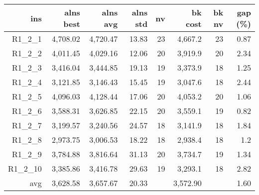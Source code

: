   \begin{table}[caption={Kết quả đo với tập HG\_R\_1\_2 200 yêu cầu}, label=exp:HGR12]
      \centering
      \begin{tabular}{rrrrrrrr}
        \hline
        ins & alns best & alns avg & alns std & nv & bk cost & bk nv & gap (\%) \\ \hline
        R1\_2\_1 & 4,708.02 & 4,720.47 & 13.83 & 23 & 4,667.2 & 23 & 0.87 \\ \hline
        R1\_2\_2 & 4,011.45 & 4,029.16 & 12.06 & 20 & 3,919.9 & 20 & 2.34 \\ \hline
        R1\_2\_3 & 3,416.04 & 3,444.85 & 19.13 & 19 & 3,373.9 & 18 & 1.25 \\ \hline
        R1\_2\_4 & 3,121.85 & 3,146.43 & 15.45 & 19 & 3,047.6 & 18 & 2.44 \\ \hline
        R1\_2\_5 & 4,096.03 & 4,128.44 & 17.06 & 20 & 4,053.2 & 20 & 1.06 \\ \hline
        R1\_2\_6 & 3,588.31 & 3,626.85 & 22.15 & 20 & 3,559.1 & 19 & 0.82 \\ \hline
        R1\_2\_7 & 3,199.57 & 3,240.56 & 24.57 & 18 & 3,141.9 & 18 & 1.84 \\ \hline
        R1\_2\_8 & 2,973.75 & 3,006.53 & 18.22 & 18 & 2,938.4 & 18 & 1.2 \\ \hline
        R1\_2\_9 & 3,784.88 & 3,816.64 & 31.13 & 20 & 3,734.7 & 19 & 1.34 \\ \hline
        R1\_2\_10 & 3,385.86 & 3,416.78 & 29.63 & 19 & 3,293.1 & 18 & 2.82 \\ \hline
        avg & 3,628.58 & 3,657.67 & 20.33 & & 3,572.90 & & 1.60 \\ \hline
      \end{tabular}
  \end{table}
      
